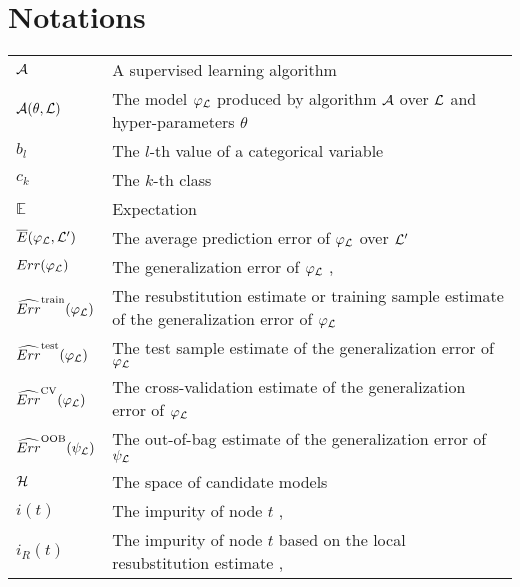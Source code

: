 
\chapter{Notations}

\begin{tabularx}{\textwidth}{ l X }
${\cal A}$ & A supervised learning algorithm \dotfill  \pageref{ntn:A}\\
${\cal A}(\theta, {\cal L})$ & The model $\varphi_{\cal L}$ produced by algorithm ${\cal A}$ over ${\cal L}$ and hyper-parameters $\theta$ \dotfill  \pageref{ntn:A-func}\\
$b_l$ & The $l$-th value of a categorical variable \dotfill  \pageref{ntn:b_l}\\
$c_k$ & The $k$-th class \dotfill  \pageref{ntn:c_k}\\
$\mathbb{E}$ & Expectation \dotfill \\
$\overline{E}(\varphi_{\cal L}, {\cal L}^\prime)$ & The average prediction error of $\varphi_{\cal L}$ over ${\cal L}^\prime$ \dotfill  \pageref{ntn:E_bar}\\
$Err(\varphi_{\cal L})$ & The generalization error of $\varphi_{\cal L}$ \dotfill  \pageref{eqn:generalization-error}, \pageref{eqn:4:generalization-error}\\
$\widehat{Err}^\text{train}(\varphi_{\cal L})$ & The resubstitution estimate or training sample estimate of the generalization error of $\varphi_{\cal L}$ \dotfill  \pageref{eqn:training-error}\\
$\widehat{Err}^\text{test}(\varphi_{\cal L})$ & The test sample estimate of the generalization error of $\varphi_{\cal L}$ \dotfill  \pageref{eqn:test-error}\\
$\widehat{Err}^\text{CV}(\varphi_{\cal L})$ & The cross-validation  estimate of the generalization error of $\varphi_{\cal L}$ \dotfill  \pageref{eqn:cv-error}\\
$\widehat{Err}^\text{OOB}(\psi_{\cal L})$ & The out-of-bag estimate of the generalization error of $\psi_{\cal L}$ \dotfill  \pageref{eqn:oob-error}\\
${\cal H}$ & The space of candidate models \dotfill  \pageref{ntn:H}\\
$i(t)$ & The impurity of node $t$ \dotfill  \pageref{ntn:i_t}, \pageref{ntn:i_t2}\\
$i_R(t)$ & The impurity of node $t$ based on the local resubstitution estimate \dotfill \pageref{eqn:impurity:error},~\pageref{eqn:impurity:variance}\\

\end{tabularx}
